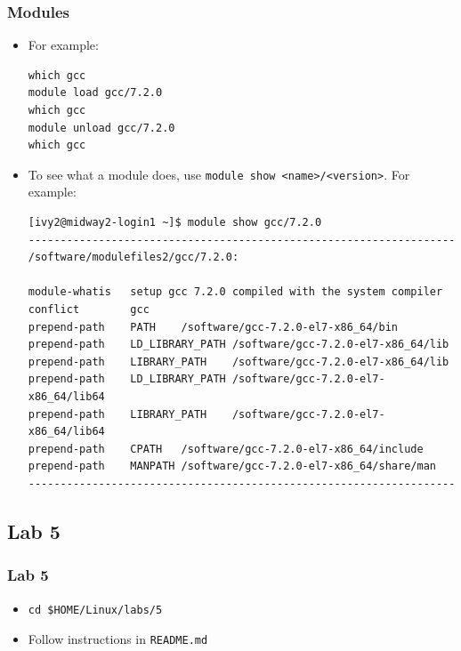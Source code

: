 \documentclass{beamer}
\begin{document}
\begin{frame}[fragile]
  \frametitle{Modules}
\begin{itemize}
\item For example:
{\color{mycolorcli}
\begin{verbatim}
which gcc
module load gcc/7.2.0
which gcc
module unload gcc/7.2.0
which gcc
\end{verbatim}
}
\item To see what a module does, use {\color{mycolorcli}\verb|module show <name>/<version>|}. For example:
{\tiny
{\color{mycolorcli}
\begin{verbatim}
[ivy2@midway2-login1 ~]$ module show gcc/7.2.0                                                                                                                                                
-------------------------------------------------------------------                                                                                                                           
/software/modulefiles2/gcc/7.2.0:                                                                                                                                                             

module-whatis   setup gcc 7.2.0 compiled with the system compiler
conflict        gcc
prepend-path    PATH    /software/gcc-7.2.0-el7-x86_64/bin
prepend-path    LD_LIBRARY_PATH /software/gcc-7.2.0-el7-x86_64/lib
prepend-path    LIBRARY_PATH    /software/gcc-7.2.0-el7-x86_64/lib
prepend-path    LD_LIBRARY_PATH /software/gcc-7.2.0-el7-x86_64/lib64
prepend-path    LIBRARY_PATH    /software/gcc-7.2.0-el7-x86_64/lib64
prepend-path    CPATH   /software/gcc-7.2.0-el7-x86_64/include
prepend-path    MANPATH /software/gcc-7.2.0-el7-x86_64/share/man
-------------------------------------------------------------------

\end{verbatim}
}
}

\end{itemize}
\end{frame}


\subsection{Lab 5}
\begin{frame}[fragile]
  \frametitle{Lab 5}
\begin{itemize}
\item
{\color{mycolorcli}
\begin{verbatim}
cd $HOME/Linux/labs/5
\end{verbatim}
}
\item Follow instructions in {\color{mycolorcli}\verb|README.md|}
\end{itemize}

\end{frame}
\end{document}
